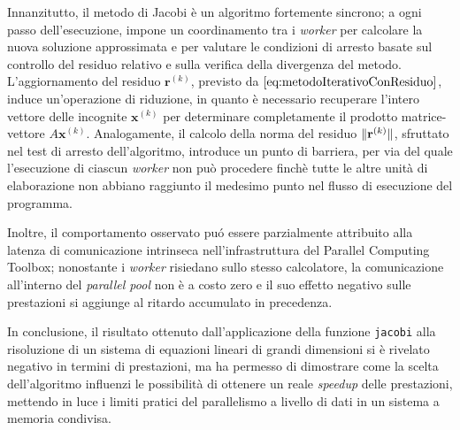 Innanzitutto, il metodo di Jacobi \`e un algoritmo fortemente sincrono; a ogni passo dell'esecuzione, impone un coordinamento tra i \textit{worker} per calcolare la nuova soluzione approssimata e per valutare le condizioni di arresto basate sul controllo del residuo relativo e sulla verifica della divergenza del metodo.\newline
L'aggiornamento del residuo $\mathbf{r}^{(k)}$, previsto da $\eqref{eq:metodoIterativoConResiduo}$, induce un'operazione di riduzione, in quanto \`e necessario recuperare l'intero vettore delle incognite $\mathbf{x}^{(k)}$ per determinare completamente il prodotto matrice-vettore $A\mathbf{x}^{(k)}$.\newline
Analogamente, il calcolo della norma del residuo $\lVert\mathbf{r}^{(k)}\rVert$, sfruttato nel test di arresto dell'algoritmo, introduce un punto di barriera, per via del quale l'esecuzione di ciascun \textit{worker} non pu\`o procedere finch\`e tutte le altre unit\`a di elaborazione non abbiano raggiunto il medesimo punto nel flusso di esecuzione del programma.

Inoltre, il comportamento osservato pu\'o essere parzialmente attribuito alla latenza di comunicazione intrinseca nell'infrastruttura del Parallel Computing Toolbox; nonostante i \textit{worker} risiedano sullo stesso calcolatore, la comunicazione all'interno del \textit{parallel pool} non \`e a costo zero e il suo effetto negativo sulle prestazioni si aggiunge al ritardo accumulato in precedenza.

In conclusione, il risultato ottenuto dall'applicazione della funzione \lstinline{jacobi} alla risoluzione di un sistema di equazioni lineari di grandi dimensioni si \`e rivelato negativo in termini di prestazioni, ma ha permesso di dimostrare come la scelta dell'algoritmo influenzi le possibilit\`a di ottenere un reale \textit{speedup} delle prestazioni, mettendo in luce i limiti pratici del parallelismo a livello di dati in un sistema a memoria condivisa.

